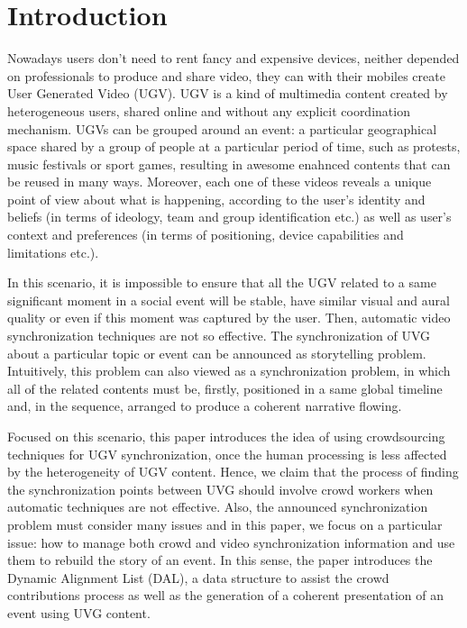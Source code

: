 \documentclass[sigconf]{acmart}
\begin{document}


\maketitle


\section{Introduction}
\label{sec:intro}
Nowadays users don't need to rent fancy and expensive devices, neither depended on professionals to produce and share video, they can with their mobiles create User Generated Video (UGV). UGV is a kind of multimedia content created by heterogeneous users, shared online and without any explicit coordination mechanism. UGVs can be grouped around an event: a particular geographical space shared by a group of people at a particular period of time, such as protests, music festivals or sport games, resulting in awesome enahnced contents that can be reused in many ways. Moreover, each one of these videos reveals a unique point of view about what is happening, according to the user's identity and beliefs (in terms of ideology, team and group identification etc.) as well as user's context and preferences (in terms of positioning, device capabilities and limitations etc.). 

In this scenario, it is impossible to ensure that all the UGV related to a same significant moment in a social event will be stable, have similar visual and aural quality or even if this moment was captured by the user. Then, automatic video synchronization techniques are not so effective. The synchronization of UVG about a particular topic or event can be announced as storytelling problem. Intuitively, this problem can also viewed as a synchronization problem, in which all of the related contents must be, firstly, positioned in a same global timeline and, in the sequence, arranged to produce a coherent narrative flowing.

Focused on this scenario, this paper introduces the idea of using crowdsourcing techniques for UGV synchronization, once the human processing is less affected by the heterogeneity of UGV content. Hence, we claim that the process of finding the synchronization points between UVG should involve crowd workers when automatic techniques are not effective. Also, the announced synchronization problem must consider many issues and in this paper, we focus on a particular issue: how to manage both crowd and video synchronization information and use them to rebuild the story of an event. In this sense, the paper introduces the Dynamic Alignment List (DAL), a data structure to assist the crowd contributions process as well as the generation of a coherent presentation of an event using UVG content. 
\end{document}
